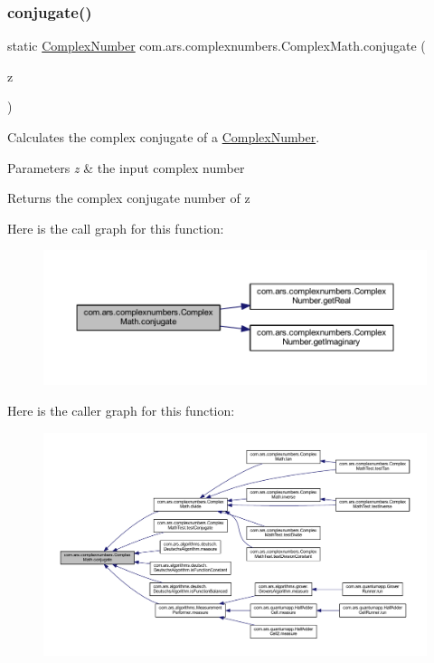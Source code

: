 \subsubsection{\texorpdfstring{conjugate()}{conjugate()}}
{\footnotesize\ttfamily static \hyperlink{classcom_1_1ars_1_1complexnumbers_1_1_complex_number}{Complex\+Number} com.\+ars.\+complexnumbers.\+Complex\+Math.\+conjugate (\begin{DoxyParamCaption}\item[{\hyperlink{classcom_1_1ars_1_1complexnumbers_1_1_complex_number}{Complex\+Number}}]{z }\end{DoxyParamCaption})\hspace{0.3cm}{\ttfamily [static]}}

Calculates the complex conjugate of a {\ttfamily \hyperlink{classcom_1_1ars_1_1complexnumbers_1_1_complex_number}{Complex\+Number}}. 
\begin{DoxyParams}{Parameters}
{\em z} & the input complex number \\
\hline
\end{DoxyParams}
\begin{DoxyReturn}{Returns}
the complex conjugate number of z 
\end{DoxyReturn}
Here is the call graph for this function\+:\nopagebreak
\begin{figure}[H]
\begin{center}
\leavevmode
\includegraphics[width=350pt]{classcom_1_1ars_1_1complexnumbers_1_1_complex_math_aed293397f1ec0c1dda82589b436388c3_cgraph}
\end{center}
\end{figure}
Here is the caller graph for this function\+:
\nopagebreak
\begin{figure}[H]
\begin{center}
\leavevmode
\includegraphics[width=350pt]{classcom_1_1ars_1_1complexnumbers_1_1_complex_math_aed293397f1ec0c1dda82589b436388c3_icgraph}
\end{center}
\end{figure}

